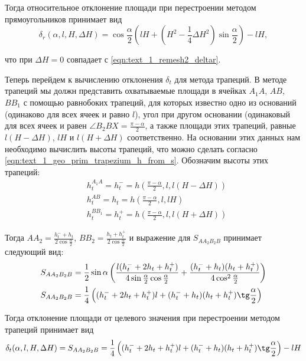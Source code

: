 Тогда относительное отклонение площади при перестроении методом прямоугольников принимает вид
\begin{equation}
	\delta_r(\alpha, l, H, \Delta H) = \cos \frac{\alpha}{2} \left( lH + \left( H^2 - \frac{1}{4} \Delta H^2 \right) \sin \frac{\alpha}{2} \right) - lH,
\end{equation}

что при $\Delta H = 0$ совпадает с \eqref{eqn:text_1_remesh2_deltar}.

Теперь перейдем к вычислению отклонения $\delta_t$ для метода трапеций.
В методе трапеций мы должн представить охватываемые площади в ячейках $A_1A$, $AB$, $BB_1$ с помощью равнобоких трапеций, для которых известно одно из оснований (одинаково для всех ячеек и равно $l$), угол при другом основании (одинаковый для всех ячеек и равен $\angle B_2BX = \frac{\pi - \alpha}{2}$, а также площади этих трапеций, равные $l(H - \Delta H)$, $lH$ и $l(H + \Delta H)$ соответственно.
На основании этих данных нам необходимо вычислить высоты трапеций, что можно сделать согласно \eqref{eqn:text_1_geo_prim_trapezium_h_from_s}.
Обозначим высоты этих трапеций:
\begin{equation}
	\begin{aligned}	
		& h_t^{A_1A} = h_t^{-} = h\left(\frac{\pi - \alpha}{2}, l, l(H - \Delta H)\right) \\ 
		& h_t^{AB} = h_t = h\left(\frac{\pi - \alpha}{2}, l, lH\right) \\
		& h_t^{BB_1} = h_t^{+} = h\left(\frac{\pi - \alpha}{2}, l, l(H + \Delta H)\right)
	\end{aligned}
\end{equation}

Тогда $AA_2 = \frac{h_t^{-} + h_t}{2 \cos \frac{\alpha}{2}}$, $BB_2 = \frac{h_t + h_t^{+}}{2 \cos \frac{\alpha}{2}}$ и выражение для $S_{AA_2B_2B}$ принимает следующий вид:
\begin{equation}
	\begin{aligned}
		& S_{AA_2B_2B} = \frac{1}{2} \sin \alpha \left( \frac{l (h_t^{-} + 2 h_t + h_t^{+})}{4 \sin \frac{\alpha}{2} \cos \frac{\alpha}{2}} + \frac{(h_t^{-} + h_t)(h_t + h_t^{+})}{4 \cos^2 \frac{\alpha}{2}} \right) \\
		& S_{AA_2B_2B} = \frac{1}{4} \left( (h_t^{-} + 2 h_t + h_t^{+})l + (h_t^{-} + h_t) (h_t + h_t^{+}) \tg \frac{\alpha}{2} \right)
	\end{aligned}
\end{equation}

Тогда отклонение площади от целевого значения при перестроении методом трапеций принимает вид
\begin{equation}
	\delta_t(\alpha, l, H, \Delta H) = S_{AA_2B_2B} = \frac{1}{4} \left( (h_t^{-} + 2 h_t + h_t^{+})l + (h_t^{-} + h_t) (h_t + h_t^{+}) \tg \frac{\alpha}{2} \right) - lH
\end{equation}

